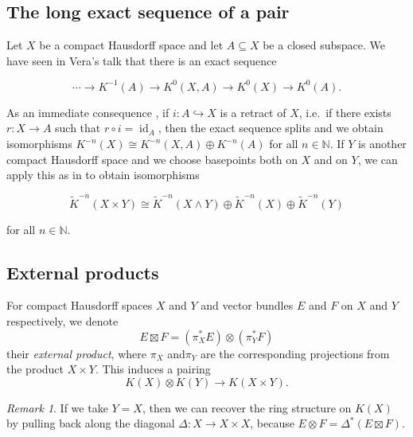 \documentclass[12pt,a4paper]{amsart}
\theoremstyle{plain}
\theoremstyle{definition}
\theoremstyle{remark}
\newtheorem{rem}[thm]{Remark}
\begin{document}
\subsection{The long exact sequence of a pair}

Let $X$ be a compact Hausdorff space and let $A \subseteq X$ be a closed subspace.
We have seen in Vera's talk \cite[Proposition 2.4.4]{ati67} that there is an exact sequence

\[ \cdots \to K^{-1}(A) \to K^{0}(X,A) \to K^{0}(X) \to K^{0}(A). \]

As an immediate consequence \cite[Corollary 2.4.7]{ati67}, if $i \colon A \hookrightarrow X$ is a retract of $X$, i.e.~if there exists $r \colon X \to A$ such that $r \circ i = \operatorname{id}_{A}$, then the exact sequence splits and we obtain isomorphisms $K^{-n}(X) \cong K^{-n}(X,A) \oplus K^{-n}(A)$ for all $n \in \mathbb{N}$.
If $Y$ is another compact Hausdorff space and we choose basepoints both on $X$ and on $Y$, we can apply this as in \cite[Corollary 2.4.8]{ati67} to obtain isomorphisms

\[ \tilde{K}^{-n}(X \times Y) \cong \tilde{K}^{-n}(X \wedge Y) \oplus \tilde{K}^{-n}(X) \oplus \tilde{K}^{-n}(Y) \]

for all $n \in \mathbb{N}$.

\subsection{External products}

For compact Hausdorff spaces $X$ and $Y$ and vector bundles $E$ and $F$ on $X$ and $Y$ respectively, we denote
\[ E \boxtimes F = (\pi_{X}^{*}E) \otimes (\pi_{Y}^{*}F) \]
their \textit{external product}, where $\pi_{X}$ and$\pi_{Y}$ are the corresponding projections from the product $X \times Y$.
This induces a pairing
\[ K(X) \otimes K(Y) \to K(X \times Y). \]

\begin{rem}
  If we take $Y = X$, then we can recover the ring structure on $K(X)$ by pulling back along the diagonal $\Delta \colon X \to X \times X$, because $E \otimes F = \Delta^{*}(E \boxtimes F)$.
\end{rem}
\end{document}
